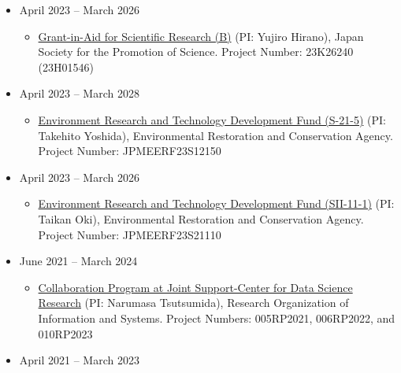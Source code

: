 \documentclass[
]{book}
\providecommand{\tightlist}{%
  \setlength{\itemsep}{0pt}\setlength{\parskip}{0pt}}
\begin{document}
\begin{itemize}
  \begin{itemize}
  \tightlist
  \item
    \href{https://kaken.nii.ac.jp/en/grant/KAKENHI-PROJECT-23K26272/}{Grant-in-Aid for Scientific Research (B)} (PI: Akito Murayama),
    Japan Society for the Promotion of Science.
    Project Number: 23K26272 (23H01578)
  \end{itemize}
\item
  April 2023 -- March 2026

  \begin{itemize}
  \tightlist
  \item
    \href{https://kaken.nii.ac.jp/en/grant/KAKENHI-PROJECT-23K26240/}{Grant-in-Aid for Scientific Research (B)} (PI: Yujiro Hirano),
    Japan Society for the Promotion of Science.
    Project Number: 23K26240 (23H01546)
  \end{itemize}
\item
  April 2023 -- March 2028

  \begin{itemize}
  \tightlist
  \item
    \href{https://www.erca.go.jp/suishinhi/index.html}{Environment Research and Technology Development Fund (S-21-5)} (PI: Takehito Yoshida),
    Environmental Restoration and Conservation Agency.
    Project Number: JPMEERF23S12150
  \end{itemize}
\item
  April 2023 -- March 2026

  \begin{itemize}
  \tightlist
  \item
    \href{https://www.erca.go.jp/suishinhi/index.html}{Environment Research and Technology Development Fund (SII-11-1)} (PI: Taikan Oki),
    Environmental Restoration and Conservation Agency.
    Project Number: JPMEERF23S21110
  \end{itemize}
\item
  June 2021 -- March 2024

  \begin{itemize}
  \tightlist
  \item
    \href{https://ds.rois.ac.jp/en_crp/en_calling/}{Collaboration Program at Joint Support-Center for Data Science Research} (PI: Narumasa Tsutsumida),
    Research Organization of Information and Systems.
    Project Numbers: 005RP2021, 006RP2022, and 010RP2023
  \end{itemize}
\item
  April 2021 -- March 2023


\end{itemize}
\end{document}
